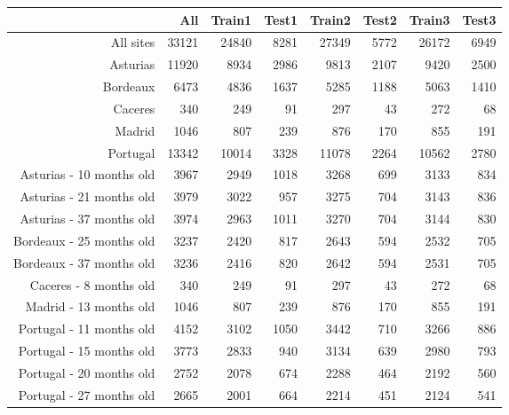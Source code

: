 \begin{table}[ht]
\centering
\begin{tabular}{rrrrrrrr}
  \hline
 & All & Train1 & Test1 & Train2 & Test2 & Train3 & Test3 \\ 
  \hline
All sites & 33121 & 24840 & 8281 & 27349 & 5772 & 26172 & 6949 \\ 
  Asturias & 11920 & 8934 & 2986 & 9813 & 2107 & 9420 & 2500 \\ 
  Bordeaux & 6473 & 4836 & 1637 & 5285 & 1188 & 5063 & 1410 \\ 
  Caceres & 340 & 249 & 91 & 297 & 43 & 272 & 68 \\ 
  Madrid & 1046 & 807 & 239 & 876 & 170 & 855 & 191 \\ 
  Portugal & 13342 & 10014 & 3328 & 11078 & 2264 & 10562 & 2780 \\ 
  Asturias - 10 months old & 3967 & 2949 & 1018 & 3268 & 699 & 3133 & 834 \\ 
  Asturias - 21 months old & 3979 & 3022 & 957 & 3275 & 704 & 3143 & 836 \\ 
  Asturias - 37 months old & 3974 & 2963 & 1011 & 3270 & 704 & 3144 & 830 \\ 
  Bordeaux - 25 months old & 3237 & 2420 & 817 & 2643 & 594 & 2532 & 705 \\ 
  Bordeaux - 37 months old & 3236 & 2416 & 820 & 2642 & 594 & 2531 & 705 \\ 
  Caceres - 8 months old & 340 & 249 & 91 & 297 & 43 & 272 & 68 \\ 
  Madrid - 13 months old & 1046 & 807 & 239 & 876 & 170 & 855 & 191 \\ 
  Portugal - 11 months old & 4152 & 3102 & 1050 & 3442 & 710 & 3266 & 886 \\ 
  Portugal - 15 months old & 3773 & 2833 & 940 & 3134 & 639 & 2980 & 793 \\ 
  Portugal - 20 months old & 2752 & 2078 & 674 & 2288 & 464 & 2192 & 560 \\ 
  Portugal - 27 months old & 2665 & 2001 & 664 & 2214 & 451 & 2124 & 541 \\ 
   \hline
\end{tabular}
\end{table}
